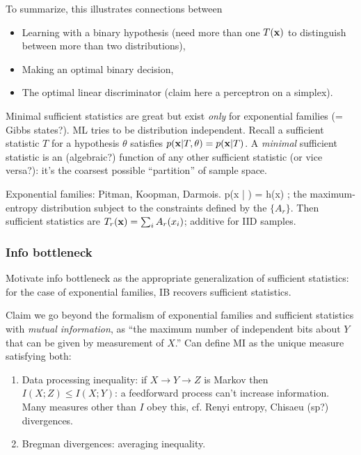 \documentclass[notitlepage,openany,11pt]{report}
\numberwithin{equation}{section}
\theoremstyle{plain}%
\begin{document}
To summarize, this illustrates connections between
\begin{itemize}
\item Learning with a binary hypothesis (need more than one $T(\mathbf{x})$ to distinguish between more than two distributions),
\item Making an optimal binary decision,
\item The optimal linear discriminator (claim here a perceptron on a simplex).
\end{itemize}

Minimal sufficient statistics are great but exist \emph{only} for exponential families (= Gibbs states?). ML tries to be distribution independent. Recall a sufficient statistic $T$ for a hypothesis $\theta$ satisfies $p(\mathbf{x}|T,\theta) = p(\mathbf{x}|T)$. A \emph{minimal} sufficient statistic is an (algebraic?) function of any other sufficient statistic (or vice versa?): it's the coarsest possible ``partition'' of sample space.

Exponential families: Pitman, Koopman, Darmois.
\be
p(x | \theta) = h(x) \exp {};
\ee
the maximum-entropy distribution subject to the constraints defined by the $\{ A_{r}\}$. Then sufficient statistics are $T_{r}(\mathbf{x}) = \sum_{i} A_{r}(x_{i})$; additive for IID samples.

\subsubsection{Info bottleneck}
Motivate info bottleneck as the appropriate generalization of sufficient statistics: for the case of exponential families, IB recovers sufficient statistics.

Claim we go beyond the formalism of exponential families and sufficient statistics with \emph{mutual information}, as ``the maximum number of independent bits about $Y$ that can be given by measurement of $X$.'' Can define MI as the unique measure satisfying both:
\begin{enumerate}
\item Data processing inequality: if $X \rightarrow Y \rightarrow Z$ is Markov then $I(X;Z) \leq I(X;Y)$: a feedforward process can't increase information. Many measures other than $I$ obey this, cf. Renyi entropy, Chisaeu (sp?) divergences.
\item Bregman divergences: averaging inequality.
\end{enumerate}
\end{document}
